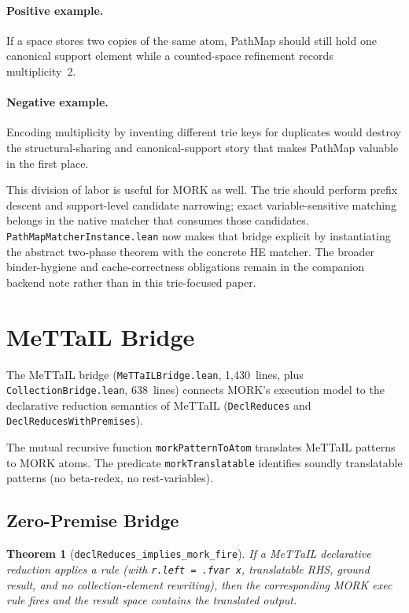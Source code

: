 \documentclass[11pt]{article}
\newtheorem{theorem}{Theorem}[section]
\theoremstyle{definition}
\theoremstyle{remark}
\newcommand{\MORK}{\textup{MORK}}
\newcommand{\MeTTaIL}{\textup{MeTTaIL}}
\newcommand{\HE}{\textup{HE}}
\newcommand{\PathMap}{\textup{PathMap}}
\begin{document}
\paragraph{Positive example.}
If a space stores two copies of the same atom, \PathMap{} should still hold
one canonical support element while a counted-space refinement records
multiplicity~2.

\paragraph{Negative example.}
Encoding multiplicity by inventing different trie keys for duplicates would
destroy the structural-sharing and canonical-support story that makes
\PathMap{} valuable in the first place.

This division of labor is useful for \MORK{} as well.  The trie should
perform prefix descent and support-level candidate narrowing; exact
variable-sensitive matching belongs in the native matcher that consumes those
candidates.  \texttt{PathMapMatcherInstance.lean} now makes that bridge
explicit by instantiating the abstract two-phase theorem with the concrete
\HE{} matcher.  The broader binder-hygiene and cache-correctness obligations
remain in the companion backend note rather than in this trie-focused paper.

\section{MeTTaIL Bridge}
\label{sec:mettail}

The \MeTTaIL{} bridge (\texttt{MeTTaILBridge.lean}, 1{,}430~lines, plus
\texttt{CollectionBridge.lean}, 638~lines) connects \MORK{}'s execution
model to the declarative reduction semantics of \MeTTaIL{}
(\texttt{DeclReduces} and \texttt{DeclReducesWithPremises}).

The mutual recursive function \texttt{morkPatternToAtom} translates
\MeTTaIL{} patterns to \MORK{} atoms.
The predicate \texttt{morkTranslatable} identifies soundly translatable
patterns (no beta-redex, no rest-variables).

\subsection{Zero-Premise Bridge}

\begin{theorem}[\texttt{declReduces\_implies\_mork\_fire}]
\label{thm:bridge}
If a \MeTTaIL{} declarative reduction applies a rule (with \texttt{r.left =
.fvar x}, translatable RHS, ground result, and no collection-element
rewriting), then the corresponding \MORK{} exec rule fires and the result
space contains the translated output.
\end{theorem}
\end{document}
